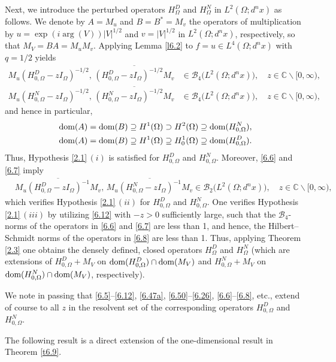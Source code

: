 \documentclass[reqno,10pt, centertags]{amsart}
\newcommand{\bbC}{{\mathbb{C}}}
\newcommand{\cB}{{\mathcal B}}
\newcommand{\abs}[1]{\left\lvert#1\right\rvert}
\newcommand{\lb}{\label}
\newcommand{\ol}{\overline}
\newcommand{\Om}{\Omega}
\newcommand{\dom}{\text{\rm{dom}}}
\numberwithin{equation}{section}
\theoremstyle{definition}
\begin{document}
Next, we introduce the perturbed operators $H_{\Om}^D$ and
$H_{\Om}^N$ in $L^{2}(\Om;d^nx)$ as follows. We denote by $A=M_u$ and
$B=B^*=M_v$ the operators of multiplication by
$u=\exp(i\arg(V))\abs{V}^{1/2}$ and $v=\abs{V}^{1/2}$ in
$L^{2}(\Om;d^nx)$, respectively, so that $M_V=B A=M_u M_v$. Applying
Lemma \ref{l6.2} to $f=u\in L^4(\Om;d^nx)$ with $q=1/2$ yields
\begin{align}
M_u(H_{0,\Om}^D-zI_{\Om})^{-1/2}, \, \ol{(H_{0,\Om}^D-zI_{\Om})^{-1/2}M_v}
&\in\cB_4\big(L^2(\Om;d^nx)\big), \quad z\in\bbC\backslash [0,\infty),
\lb{6.6}
\\
M_u(H_{0,\Om}^N-zI_{\Om})^{-1/2}, \, \ol{(H_{0,\Om}^N-zI_{\Om})^{-1/2}M_v}
&\in\cB_4\big(L^2(\Om;d^nx)\big), \quad z\in\bbC\backslash [0,\infty),
\lb{6.7}
\end{align}
and hence in particular,
\begin{align}
& \dom(A)=\dom(B) \supseteq  H^{1}(\Om) \supset H^{2}(\Om)
\supseteq \dom(H^N_{0,\Om}),  \lb{6.56a} \\
& \dom(A)=\dom(B) \supseteq  H^{1}(\Om) \supseteq H^{1}_0(\Om)
\supseteq \dom(H^D_{0,\Om}).  \lb{6.57a}
\end{align}
Thus, Hypothesis \ref{2.1}\,$(i)$ is satisfied for $H_{0,\Om}^D$ and
$H_{0,\Om}^N$. Moreover, \eqref{6.6} and \eqref{6.7} imply
\begin{align}
&\ol{M_u(H_{0,\Om}^D-zI_{\Om})^{-1}M_v}, \,
\ol{M_u(H_{0,\Om}^N-zI_{\Om})^{-1}M_v}
\in\cB_2\big(L^2(\Om;d^nx)\big), \quad z\in\bbC\backslash [0,\infty),
\lb{6.8}
\end{align}
which verifies Hypothesis \ref{2.1}\,$(ii)$ for $H_{0,\Om}^D$ and
$H_{0,\Om}^N$. One verifies Hypothesis \ref{2.1}\,$(iii)$ by
utilizing \eqref{6.12} with 
$-z>0$ sufficiently large, such that the $\cB_4$-norms of the operators in \eqref{6.6}
and \eqref{6.7} are less than 1, and hence, the Hilbert--Schmidt
norms of the operators in \eqref{6.8} are less than 1. Thus, applying
Theorem \ref{2.3} one obtains the densely defined, closed
operators $H_{\Om}^D$ and $H_{\Om}^N$ (which are extensions of
$H_{0,\Om}^D+M_V$ on $\dom(H_{0,\Om}^D)\cap\dom(M_V)$ and
$H_{0,\Om}^N+M_V$ on
$\dom(H_{0,\Om}^N)\cap\dom(M_V)$, respectively).


We note in passing that \eqref{6.5}--\eqref{6.12},
\eqref{6.47a}, \eqref{6.50}--\eqref{6.26}, \eqref{6.6}--\eqref{6.8}, etc.,
extend of course to all $z$ in the resolvent set of the corresponding
operators $H_{0,\Om}^D$ and $H_{0,\Om}^N$.

The following result is a direct extension of the one-dimensional result
in Theorem \ref{t6.9}.
\end{document}
